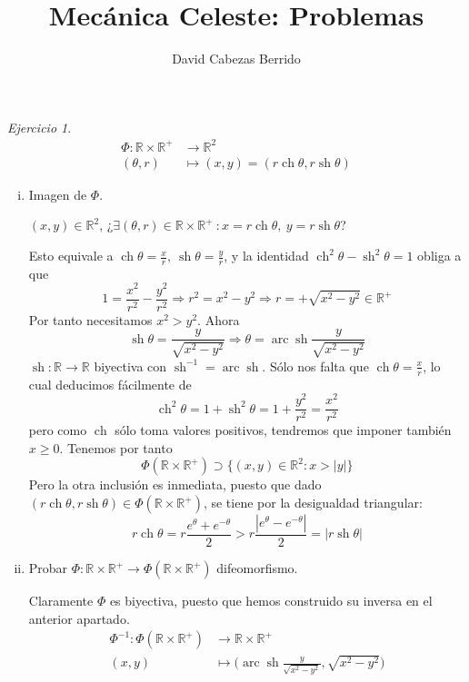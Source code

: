 \documentclass[12pt,spanish]{article}
\title{Mecánica Celeste: Problemas}
\author{David Cabezas Berrido}
\date{}
\theoremstyle{definition}
\theoremstyle{remark}
\newtheorem{exercise}{Ejercicio}
\newcommand{\R}{\mathbb{R}}
\begin{document}
\maketitle

\newcommand{\ch}{\operatorname{ch}}
\newcommand{\sh}{\operatorname{sh}}
\newcommand{\ach}{\operatorname{arc}\ch}
\newcommand{\ash}{\operatorname{arc}\sh}

\setcounter{exercise}{4}
\begin{exercise}
  \begin{align*}
    \Phi : \R\times \mathbb{R}^+&\rightarrow\R^2 \\
    (\theta,r)&\mapsto (x,y)=(r\ch\theta,r\sh\theta)
  \end{align*}

  \begin{enumerate}[i)]
  \item Imagen de $\Phi$.

    $(x,y)\in\R^2$,
    ¿$\exists (\theta,r)\in\R\times\R^+\ : x=r\ch\theta,\ y=r\sh\theta$?

    Esto equivale a $\ch\theta =\frac{x}{r},\ \sh\theta = \frac{y}{r}$,
    y la identidad $\ch^2\theta-\sh^2\theta=1$ obliga a que
    \[1=\frac{x^2}{r^2}-\frac{y^2}{r^2}\Rightarrow
      r^2=x^2-y^2\Rightarrow r=+\sqrt{x^2-y^2}\in\R^+\]
    Por tanto necesitamos $x^2>y^2$. Ahora
    \[\sh\theta=\frac{y}{\sqrt{x^2-y^2}}\Rightarrow \theta = \ash\frac{y}{\sqrt{x^2-y^2}}\]
    $\sh:\R\rightarrow\R$ biyectiva con $\sh^{-1}=\ash$. Sólo nos
    falta que $\ch\theta=\frac{x}{r}$, lo cual deducimos fácilmente de
    \[\ch^2\theta=1+\sh^2\theta=1+\frac{y^2}{r^2}=\frac{x^2}{r^2}\]
    pero como $\ch$ sólo toma valores positivos, tendremos que imponer
    también $x\geq 0$. Tenemos por tanto
    \[\Phi(\R\times\R^+)\supset\{(x,y)\in\R^2:x>|y|\}\]
    Pero la otra inclusión es inmediata, puesto que dado
    $(r\ch\theta,r\sh\theta)\in\Phi(\R\times\R^+)$, se tiene por la
    desigualdad triangular:
    \[r\ch\theta = r\dfrac{e^\theta+e^{-\theta}}{2} >
    r\dfrac{|e^\theta-e^{-\theta}|}{2} = |r\sh\theta|\]

  \item Probar
    $\Phi : \R\times \mathbb{R}^+\rightarrow \Phi(\R\times\R^+)$
    difeomorfismo.

    Claramente $\Phi$ es biyectiva, puesto que hemos construido su
    inversa en el anterior apartado.
    \begin{align*}
      \Phi^{-1}: \Phi(\R\times\R^+)&\rightarrow\R\times\R^+ \\
      (x,y)&\mapsto \Big(\ash\frac{y}{\sqrt{x^2-y^2}},\sqrt{x^2-y^2}\Big)
    \end{align*}


\end{enumerate}
\end{exercise}
\end{document}
